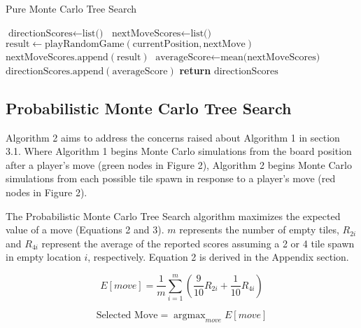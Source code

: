 \documentclass{article}
\DeclareMathOperator*{\argmax}{argmax}
\begin{document}
\begin{algorithm}
    \caption{Pure Monte Carlo Tree Search}
    \begin{algorithmic}[1]
            \State $\text{directionScores} \gets \text{list()}$
                \State $\text{nextMoveScores} \gets \text{list()}$
                    \State $\text{result} \gets \text{playRandomGame}(\text{currentPosition}, \text{nextMove})$
                    \State $\text{nextMoveScores}.\text{append}(\text{result})$
                \EndFor
                \State $\text{averageScore} \gets \text{mean(nextMoveScores)}$
                \State $\text{directionScores}.\text{append}(\text{averageScore})$
            \EndFor
            \State \textbf{return} $\text{directionScores}$
        \EndFunction
    \end{algorithmic}
\end{algorithm}

\subsection{Probabilistic Monte Carlo Tree Search}
Algorithm 2 aims to address the concerns raised about Algorithm 1 in section 3.1.  Where Algorithm 1 begins Monte Carlo simulations from the board position after a player's move (green nodes in Figure 2), Algorithm 2 begins Monte Carlo simulations from each possible tile spawn in response to a player's move (red nodes in Figure 2).  

The Probabilistic Monte Carlo Tree Search algorithm maximizes the expected value of a move (Equations 2 and 3). $m$ represents the number of empty tiles, $R_{2i}$ and $R_{4i}$ represent the average of the reported scores assuming a 2 or 4 tile spawn in empty location $i$, respectively.  Equation 2 is derived in the Appendix section.

\begin{equation}
  \label{eq:expected_value}
  E[move] = \frac{1}{m}\sum_{i=1}^m \left(\frac{9}{10}R_{2i} + \frac{1}{10}R_{4i}\right)
\end{equation}

\begin{equation}
  \textrm{Selected Move} = \argmax_{move} E[move]
\end{equation}
\end{document}
